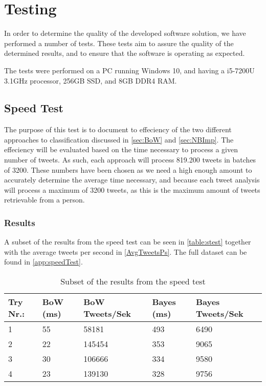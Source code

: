 \chapter{Testing}\label{cha:testing}
In order to determine the quality of the developed software solution, we have
performed a number of tests. These tests aim to assure the quality of the
determined results, and to ensure that the software is operating as expected.\nl

The tests were performed on a PC running Windows 10, and having a i5-7200U
3.1GHz processor, 256GB SSD, and 8GB DDR4 RAM.




\section{Speed Test}\label{speedtestlavel}
The purpose of this test is to document to effeciency of the two different
approaches to classification discussed in \autoref{sec:BoW} and
\autoref{sec:NBImp}. The effeciency will be evaluated based on the time
necessary to process a given number of tweets. As such, each approach will
process 819.200 tweets in batches of 3200. These numbers have been chosen as we
need a high enough amount to accurately determine the average time necessary,
and because each tweet analysis will process a maximum of 3200 tweets, as this
is the maximum amount of tweets retrievable from a person.

\subsection*{Results}
A subset of the results from the speed test can be seen in \autoref{table:stest}
together with the average tweets per second in \autoref{AvgTweetsPs}. The
full dataset can be found in \autoref{app:speedTest}.

\begin{table}[H]\centering
\begin{tabular}{|l|l|l|l|l|}
\hline
Try Nr.:	&	BoW (ms)	&	BoW Tweets/Sek	&	Bayes (ms)	&	Bayes Tweets/Sek	\\\hline
1	&	55	&	58181	&	493	&	6490 \\\hline
2	&	22	&	145454	&	353	&	9065 \\\hline
3	&	30	&	106666	&	334	&	9580 \\\hline
4	&	23	&	139130	&	328	&	9756 \\\hline		
\end{tabular}
\caption{Subset of the results from the speed test}
\label{table:stest}
\end{table}

